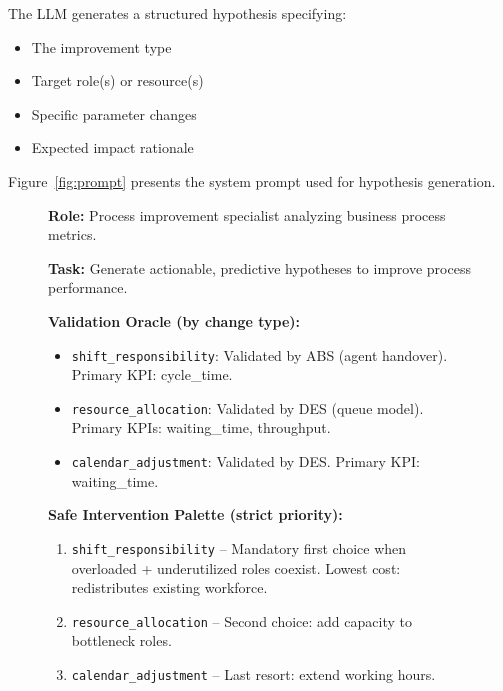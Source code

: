 \documentclass[preprint,12pt]{elsarticle}
\begin{document}
The LLM generates a structured hypothesis specifying:
\begin{itemize}
    \item The improvement type
    \item Target role(s) or resource(s)
    \item Specific parameter changes
    \item Expected impact rationale
\end{itemize}

Figure~\ref{fig:prompt} presents the system prompt used for hypothesis generation.

\begin{figure}[!t]
\begin{tcolorbox}[
    title=System Prompt: Hypothesis Generation,
    colframe=black!80,
    fonttitle=\bfseries,
    boxsep=2pt, left=5pt, right=5pt, top=1mm, bottom=1mm,
    toptitle=0.5mm, bottomtitle=0.5mm
]
    \footnotesize
    \begin{tcolorbox}[colback=rolecolor, colframe=white, boxrule=0pt,
        size=fbox, arc=0mm,
        before skip=0pt, after skip=1pt]
        \textbf{Role:} Process improvement specialist analyzing business process metrics.
    \end{tcolorbox}

    \begin{tcolorbox}[colback=goalcolor, colframe=white, boxrule=0pt,
        size=fbox, arc=0mm,
        before skip=0pt, after skip=1pt]
        \textbf{Task:} Generate actionable, predictive hypotheses to improve process performance.
    \end{tcolorbox}

    \begin{tcolorbox}[colback=rulecolor, colframe=white, boxrule=0pt,
        size=fbox, arc=0mm,
        before skip=0pt, after skip=1pt]
        \textbf{Validation Oracle (by change type):}
        \begin{itemize}[nosep, leftmargin=*, labelsep=1.5pt]
            \item \texttt{shift\_responsibility}: Validated by ABS (agent handover). Primary KPI: cycle\_time.
            \item \texttt{resource\_allocation}: Validated by DES (queue model). Primary KPIs: waiting\_time, throughput.
            \item \texttt{calendar\_adjustment}: Validated by DES. Primary KPI: waiting\_time.
        \end{itemize}

        \textbf{Safe Intervention Palette (strict priority):}
        \begin{enumerate}[nosep, leftmargin=*, labelsep=1.5pt]
            \item \texttt{shift\_responsibility} -- Mandatory first choice when overloaded + underutilized roles coexist. Lowest cost: redistributes existing workforce.
            \item \texttt{resource\_allocation} -- Second choice: add capacity to bottleneck roles.
            \item \texttt{calendar\_adjustment} -- Last resort: extend working hours.
        \end{enumerate}


\end{tcolorbox}
\end{tcolorbox}
\end{figure}
\end{document}
